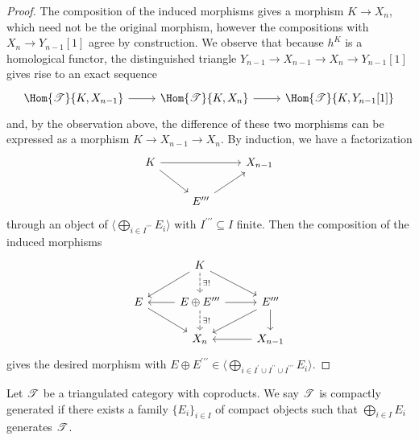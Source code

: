 \documentclass[10pt]{amsart}
\begin{document}
\begin{lem}
\begin{proof}
    The composition of the induced morphisms gives a morphism $K \rightarrow X_n$, which need not be the original morphism, however the compositions with $X_n \rightarrow Y_{n-1}[1]$ agree by construction.
    We observe that because $h^{K}$ is a homological functor, the distinguished triangle $Y_{n-1} \rightarrow X_{n-1} \rightarrow X_{n} \rightarrow Y_{n-1}[1]$ gives rise to an exact sequence
    $$\begin{tikzcd}
      \Hom{\T}{K,X_{n-1}} \arrow{r} & \Hom{\T}{K,X_n} \arrow{r} & \Hom{\T}{K,Y_{n-1}[1]}
    \end{tikzcd}$$
    and, by the observation above, the difference of these two morphisms can be expressed as a morphism $K \rightarrow X_{n-1} \rightarrow X_n$.
    By induction, we have a factorization 
    $$\begin{tikzcd}
      K \arrow{rd}\arrow{rr} && X_{n-1}\\
      & E^{\prime\prime\prime}\arrow{ur}
    \end{tikzcd}$$
    through an object of $\langle \bigoplus_{i \in I^{\prime\prime\prime}} E_i\rangle$ with $I^{\prime\prime\prime} \subseteq I$ finite.
    Then the composition of the induced morphisms
    $$\begin{tikzcd}
      & K\arrow[dashed]{d}{\exists !}\arrow{ld}\arrow{rd}\\
      E\arrow{rd} & E \oplus E^{\prime\prime\prime} \arrow[dashed]{d}{\exists!}\arrow{r}\arrow{l} & E^{\prime\prime\prime}\arrow{d}\arrow{ld}\\
      & X_n & \arrow{l}X_{n-1}
    \end{tikzcd}$$
    gives the desired morphism with $E \oplus E^{\prime\prime\prime} \in \langle \bigoplus_{i \in I^\prime \cup I^{\prime\prime} \cup I^{\prime\prime\prime}} E_i\rangle.$
  \end{proof}
\end{lem}

\begin{defn}
  Let $\mathscr{T}$ be a triangulated category with coproducts.
  We say $\mathscr{T}$ is compactly generated if there exists a family $\{E_i\}_{i \in I}$ of compact objects such that $\bigoplus_{i \in I} E_i$ generates $\mathscr{T}$.
\end{defn}
\end{document}
